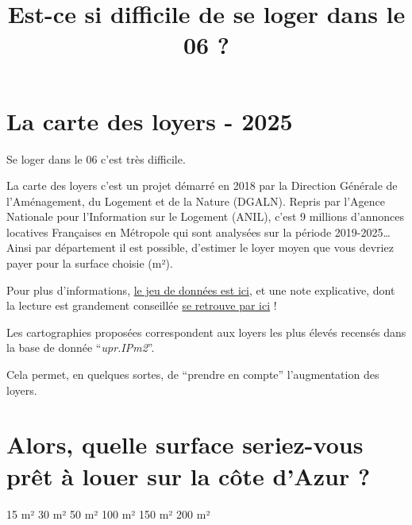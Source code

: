 \documentclass[
  letterpaper,
  DIV=11,
  numbers=noendperiod]{scrartcl}
\title{Est-ce si difficile de se loger dans le 06 ?}
\author{}
\date{}
\begin{document}
\maketitle


\section{La carte des loyers - 2025}\label{la-carte-des-loyers---2025}

Se loger dans le 06 c'est très difficile.

La carte des loyers c'est un projet démarré en 2018 par la Direction
Générale de l'Aménagement, du Logement et de la Nature (DGALN). Repris
par l'Agence Nationale pour l'Information sur le Logement (ANIL), c'est
9 millions d'annonces locatives Françaises en Métropole qui sont
analysées sur la période 2019-2025\ldots{} Ainsi par département il est
possible, d'estimer le loyer moyen que vous devriez payer pour la
surface choisie (m²).

Pour plus d'informations,
\href{https://www.data.gouv.fr/datasets/carte-des-loyers-indicateurs-de-loyers-dannonce-par-commune-en-2025}{le
jeu de données est ici}, et une note explicative, dont la lecture est
grandement conseillée
\href{https://www.data.gouv.fr/datasets/carte-des-loyers-indicateurs-de-loyers-dannonce-par-commune-en-2025?resource_id=0264d1fe-d5d2-45eb-9cf1-a2b706867441}{se
retrouve par ici} !

Les cartographies proposées correspondent aux loyers les plus élevés
recensés dans la base de donnée ``\emph{upr.IPm2}''.

Cela permet, en quelques sortes, de ``prendre en compte'' l'augmentation
des loyers.

\section{Alors, quelle surface seriez-vous prêt à louer sur la côte
d'Azur
?}\label{alors-quelle-surface-seriez-vous-pruxeat-uxe0-louer-sur-la-cuxf4te-dazur}

15 m² 30 m² 50 m² 100 m² 150 m² 200 m²

\protect{}\label{map}
\end{document}
